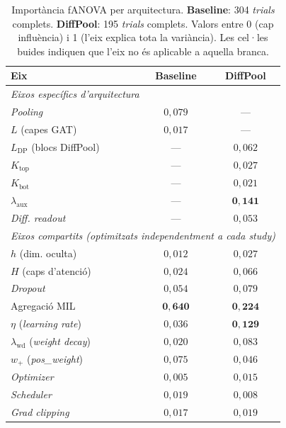 \documentclass[10pt,a4paper,twocolumn,twoside]{article}
\begin{document}
\begin{table}[H]
\centering
\caption{Importància fANOVA per arquitectura. \textbf{Baseline}: 304 \textit{trials}
complets. \textbf{DiffPool}: 195 \textit{trials} complets. Valors entre 0 (cap
influència) i 1 (l'eix explica tota la variància). Les cel·les buides indiquen que l'eix
no és aplicable a aquella branca.}
\label{tab:main-effects}
\small
\begin{tabular}{lcc}
\toprule
\textbf{Eix} & \textbf{Baseline} & \textbf{DiffPool} \\
\midrule
\multicolumn{3}{l}{\textit{Eixos específics d'arquitectura}} \\[2pt]
\textit{Pooling}                          & $0{,}079$ & --- \\
$L$ (capes GAT)                           & $0{,}017$ & --- \\
$L_{\text{DP}}$ (blocs DiffPool)          & --- & $0{,}062$ \\
$K_{\text{top}}$                          & --- & $0{,}027$ \\
$K_{\text{bot}}$                          & --- & $0{,}021$ \\
$\lambda_{\text{aux}}$                    & --- & $\mathbf{0{,}141}$ \\
\textit{Diff. readout}                    & --- & $0{,}053$ \\
\midrule
\multicolumn{3}{l}{\textit{Eixos compartits (optimitzats independentment a cada study)}} \\[2pt]
$h$ (dim. oculta)                         & $0{,}012$ & $0{,}027$ \\
$H$ (caps d'atenció)                      & $0{,}024$ & $0{,}066$ \\
\textit{Dropout}                          & $0{,}054$ & $0{,}079$ \\
Agregació MIL                             & $\mathbf{0{,}640}$ & $\mathbf{0{,}224}$ \\
$\eta$ (\textit{learning rate})           & $0{,}036$ & $\mathbf{0{,}129}$ \\
$\lambda_{\text{wd}}$ (\textit{weight decay}) & $0{,}020$ & $0{,}083$ \\
$w_+$ (\textit{pos\_weight})              & $0{,}075$ & $0{,}046$ \\
\textit{Optimizer}                        & $0{,}005$ & $0{,}015$ \\
\textit{Scheduler}                        & $0{,}019$ & $0{,}008$ \\
\textit{Grad clipping}                    & $0{,}017$ & $0{,}019$ \\
\bottomrule
\end{tabular}
\end{table}
\end{document}
